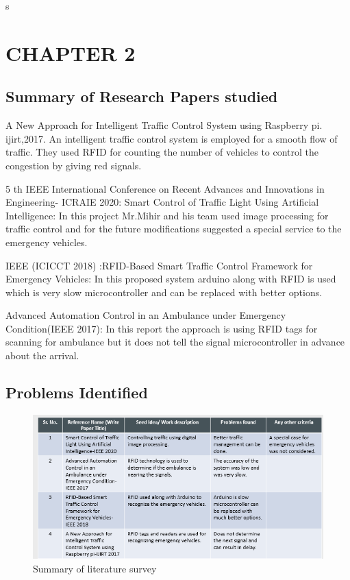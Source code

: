 \documentclass[12pt,a4paper]{report}
\begin{document}
\begin{center}
	s
\chapter{\textbf{\Large{CHAPTER 2}}}
\end{center}

\section {\textbf{ Summary of Research Papers studied}}
	A New Approach for Intelligent Traffic Control System using Raspberry pi. ijirt,2017. An intelligent traffic control system is employed for a smooth flow of traffic. They used RFID for counting the number of vehicles to control the congestion by giving red signals.\par
5 th IEEE International Conference on Recent Advances and Innovations in Engineering- ICRAIE 2020: Smart Control of Traffic Light Using Artificial Intelligence: In this project Mr.Mihir and his team used image processing for traffic control and for the future modifications suggested a special service to the emergency vehicles.\par
IEEE (ICICCT 2018) :RFID-Based Smart Traffic Control Framework for Emergency Vehicles: In this proposed system arduino along with RFID is used which is very slow microcontroller  and can be replaced with better options.\par
Advanced Automation Control in an Ambulance under Emergency Condition(IEEE 2017): In this report the approach is using  RFID tags for scanning for ambulance but it does not tell the signal microcontroller in advance about the arrival.\par



\newpage		
\section{\textbf{Problems Identified}}
	
		
		\begin{figure}[h]
			\centering
			\includegraphics[width=150mm]{summary.png}
			\caption{Summary of literature survey}
			\label{fig_12}
		\end{figure}
				
\end{document}
